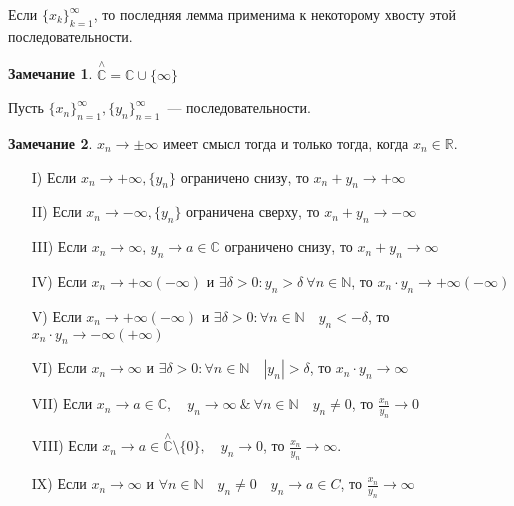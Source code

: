 \documentclass{book}
\newcommand\N{\ensuremath{\mathbb{N}}}
\newcommand\R{\ensuremath{\mathbb{R}}}
\renewcommand\C{\ensuremath{\mathbb{C}}}
\theoremstyle{definition}
\newtheorem*{note}{Замечание}
\begin{document}
    Если $\{x_k\}_{k=1}^{\infty }$, то последняя лемма применима к некоторому хвосту этой последовательности. 
    \begin{note}
        $\overset{\land}{\C} = \C\cup \{\infty \}$
    \end{note}
    \begin{theorem}

        Пусть $\{x_{n} \}_{n=1}^{\infty }, \{y_{n} \}_{n=1}^{\infty}$~--- последовательности.

    \begin{note}
        $x_{n} \to \pm \infty $ имеет смысл тогда и только тогда, когда $x_{n} \in \R$.
    \end{note}

        \begin{itemize}
            \item [I)] Если $x_n \to +\infty , \{y_{n}\}$ ограничено снизу, то $x_{n} +y_{n} \to  +\infty$ 
            \item [II)] Если $x_{n}  \to -\infty , \{y_{n} \}$ ограничена сверху, то $x_{n} +y_{n} \to -\infty$
            \item [III)] Если $x_{n} \to \infty$, $y_n\to a\in \C$ ограничено снизу, то $x_{n} +y_{n} \to \infty$
            \item [IV)] Если $x_{n} \to  +\infty(-\infty )$ и $\exists \delta>0: y_{n} >\delta\ \forall n\in \N$, то $x_{n} \cdot y_{n} \to +\infty (-\infty )$
            \item [V)] Если $x_{n} \to +\infty (-\infty )$ и $\exists \delta >0:\forall n\in \N \quad y_{n} <-\delta$, то $x_{n} \cdot y_{n}  \to -\infty (+\infty )$
            \item [VI)] Если $x_{n} \to  \infty $ и  $\exists \delta >0: \forall n\in \N  \quad |y_{n}|>\delta$, то  $x_{n} \cdot y_{n}  \to \infty$
            \item [VII)] Если $x_{n} \to a\in \C, \quad y_{n} \to \infty\ \&\ \forall n\in \N \quad y_{n} \neq 0$, то $\frac{x_{n} }{y_{n} }  \to  0$
            \item [VIII)] Если $x_{n} \to a\in \overset{\land}{\C}\setminus \{0\}, \quad y_{n} \to  0$, то  $\frac{x_{n} }{y_{n} }\to \infty$.
            \item [IX)] Если $x_{n} \to \infty$ и  $\forall n\in \N \quad y_{n} \neq 0\quad y_{n} \to a\in C$, то $\frac{x_{n} }{y_{n} } \to \infty$
        \end{itemize}
    \end{theorem}
\end{document}
